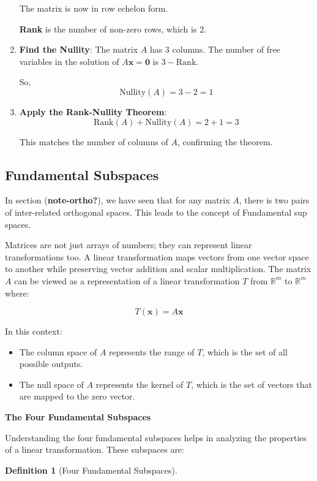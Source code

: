\documentclass[
  letterpaper,
  DIV=11,
  numbers=noendperiod]{scrreprt}
\providecommand{\tightlist}{%
  \setlength{\itemsep}{0pt}\setlength{\parskip}{0pt}}\usepackage{longtable,booktabs,array}
\theoremstyle{plain}
\theoremstyle{definition}
\newtheorem{definition}{Definition}[chapter]
\theoremstyle{remark}
\begin{document}
\begin{tcolorbox}
\begin{enumerate}
  The matrix is now in row echelon form.

  \textbf{Rank} is the number of non-zero rows, which is 2.
\item
  \textbf{Find the Nullity}: The matrix \(A\) has 3 columns. The number
  of free variables in the solution of \(A \mathbf{x} = \mathbf{0}\) is
  \(3 - \text{Rank}\).

  So, \[\text{Nullity}(A) = 3 - 2 = 1\]
\item
  \textbf{Apply the Rank-Nullity Theorem}:
  \[\text{Rank}(A) + \text{Nullity}(A) = 2 + 1 = 3\]

  This matches the number of columns of \(A\), confirming the theorem.
\end{enumerate}

\subsection{Fundamental Subspaces}\label{fundamental-subspaces}

In section (\textbf{note-ortho?}), we have seen that for any matrix
\(A\), there is two pairs of inter-related orthogonal spaces. This leads
to the concept of Fundamental sup spaces.

Matrices are not just arrays of numbers; they can represent linear
transformations too. A linear transformation maps vectors from one
vector space to another while preserving vector addition and scalar
multiplication. The matrix \(A\) can be viewed as a representation of a
linear transformation \(T\) from \(\mathbb{R}^m\) to \(\mathbb{R}^m\)
where:

\[T(\mathbf{x}) = A \mathbf{x}\]

In this context:

\begin{itemize}
\tightlist
\item
  The column space of \(A\) represents the range of \(T\), which is the
  set of all possible outputs.
\item
  The null space of \(A\) represents the kernel of \(T\), which is the
  set of vectors that are mapped to the zero vector.
\end{itemize}

\textbf{The Four Fundamental Subspaces}

Understanding the four fundamental subspaces helps in analyzing the
properties of a linear transformation. These subspaces are:

\begin{definition}[Four Fundamental
Subspaces]\protect\hypertarget{def-FFS}{}\label{def-FFS}


\end{definition}
\end{tcolorbox}
\end{document}
